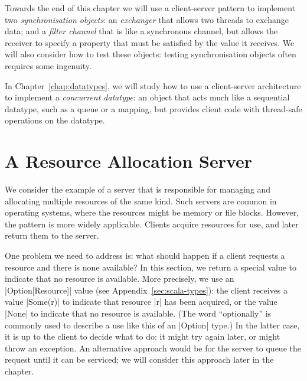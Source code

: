 Towards the end of this chapter we will use a client-server pattern to
implement two \emph{synchronisation objects}: an \emph{exchanger}
that allows two threads to exchange data; and a \emph{filter channel} that is
like a synchronous channel, but allows the receiver to specify a property that
must be satisfied by the value it receives.  We will also consider how to test
these objects: testing synchronisation objects often requires some ingenuity.

In Chapter~\ref{chap:datatypes}, we will study how to use a client-server
architecture to implement a \emph{concurrent datatype}: an object that acts much like a sequential datatype, such as a
queue or a mapping, but provides client code with thread-safe operations on
the datatype.


\section{A Resource Allocation Server}
\label{sec:resource-server-1}

We consider the example of a server that is responsible for managing and
allocating multiple resources of the same kind.  Such servers are common in
operating systems, where the resources might be memory or file blocks.
However, the pattern is more widely applicable.  Clients acquire resources for
use, and later return them to the server.

One problem we need to address is: what should happen if a client requests a
resource and there is none available?  In this section, we return a special
value to indicate that no resource is available.  More precisely, we use an
|Option[Resource]| value (see Appendix~\ref{sec:scala-types}): the client
receives a value |Some(r)| to indicate that resource |r| has been acquired, or
the value |None| to indicate that no resource is available.  (The word
``optionally'' is commonly used to describe a use like this of an |Option|
type.)
%
In the latter case, it is up to the client to decide what to do: it might try
again later, or might throw an exception.  
%
An alternative approach would be for the server to queue the request until it
can be serviced; we will consider this approach later in the chapter.


